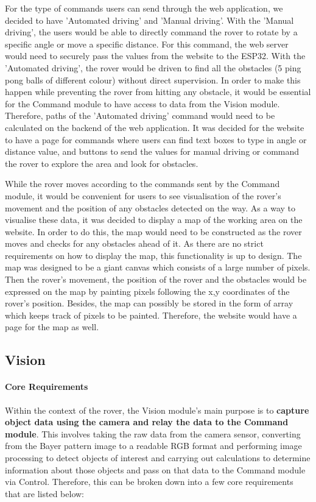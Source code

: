 \documentclass[a4paper]{article}
\begin{document}
For the type of commands users can send through the web application, we decided to have 
'Automated driving' and 'Manual driving'. With the 'Manual driving', the users would be able 
to directly command the rover to rotate by a specific angle or move a specific distance. For 
this command, the web server would need to securely pass the values from the website to the ESP32. 
With the 'Automated driving', the rover would be driven to find all the obstacles (5 ping pong 
balls of different colour) without direct supervision. In order to make this happen while 
preventing the rover from hitting any obstacle, it would be essential for the Command module 
to have access to data from the Vision module. Therefore, paths of the 'Automated driving' 
command would need to be calculated on the backend of the web application. It was decided for 
the website to have a page for commands where users can find text boxes to type in angle or distance 
value, and buttons to send the values for manual driving or command the rover to explore the area 
and look for obstacles. 

While the rover moves according to the commands sent by the Command module, it would be convenient for 
users to see visualisation of the rover's movement and the position of any obstacles detected 
on the way. As a way to visualise these data, it was decided to display a map of the working area on 
the website. In order to do this, the map would need to be constructed as the rover moves and checks 
for any obstacles ahead of it. As there are no strict requirements on how to display the map, 
this functionality is up to design. The map was designed to be a giant canvas which consists of a large 
number of pixels. Then the rover's movement, the position of the rover and the obstacles would be expressed 
on the map by painting pixels following the x,y coordinates of the rover's position. Besides, the 
map can possibly be stored in the form of array which keeps track of pixels to be painted. Therefore, the 
website would have a page for the map as well. 

\subsection{Vision}
\paragraph*{Core Requirements}

Within the context of the rover, the Vision module's main purpose is to \textbf{capture 
object data using the camera and relay the data to the Command module}. This involves 
taking the raw data from the camera sensor, converting from the Bayer pattern image to 
a readable RGB format and performing image processing to detect objects of interest and
carrying out calculations to determine information about those objects and pass on 
that data to the Command module via Control. Therefore, this can be broken down into a few
core requirements that are listed below:
\end{document}
